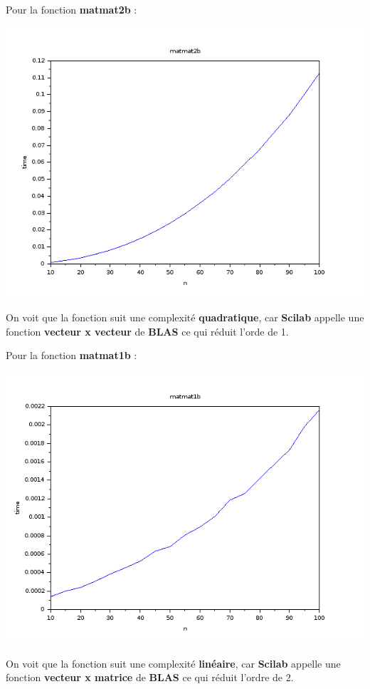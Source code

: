 \documentclass{article}
\begin{document}
Pour la fonction \textbf{matmat2b} :

\includegraphics[scale=0.5]{img/matmat2b.png}

On voit que la fonction suit une complexité \textbf{quadratique}, car
\textbf{Scilab} appelle une fonction \textbf{vecteur x vecteur} de
\textbf{BLAS} ce qui réduit l'orde de 1. \newline

Pour la fonction \textbf{matmat1b} :

\includegraphics[scale=0.5]{img/matmat1b.png}

On voit que la fonction suit une complexité \textbf{linéaire}, car
\textbf{Scilab} appelle une fonction \textbf{vecteur x matrice} de
\textbf{BLAS} ce qui réduit l'ordre de 2. \newline
\end{document}
